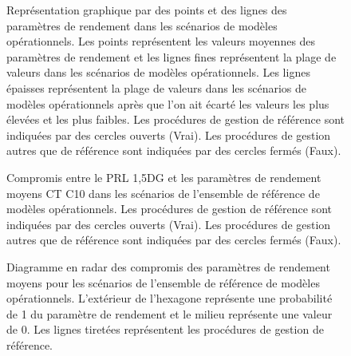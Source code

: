 \documentclass[french,11pt]{book}
\begin{document}
\begin{figure}[htb]

{\centering {} 

}

\caption{Représentation graphique par des points et des lignes des paramètres de rendement dans les scénarios de modèles opérationnels. Les points représentent les valeurs moyennes des paramètres de rendement et les lignes fines représentent la plage de valeurs dans les scénarios de modèles opérationnels. Les lignes épaisses représentent la plage de valeurs dans les scénarios de modèles opérationnels après que l'on ait écarté les valeurs les plus élevées et les plus faibles. Les procédures de gestion de référence sont indiquées par des cercles ouverts (Vrai). Les procédures de gestion autres que de référence sont indiquées par des cercles fermés (Faux).}\label{fig:dot-lines}
\end{figure}
\clearpage
\begin{figure}[htb]

{\centering {} 

}

\caption{Compromis entre le PRL 1,5DG et les paramètres de rendement moyens CT C10 dans les scénarios de l’ensemble de référence de modèles opérationnels. Les procédures de gestion de référence sont indiquées par des cercles ouverts (Vrai). Les procédures de gestion autres que de référence sont indiquées par des cercles fermés (Faux).}\label{fig:tradeoff-reference}
\end{figure}
\clearpage
\begin{figure}[htb]

{\centering {} 

}

\caption{Diagramme en radar des compromis des paramètres de rendement moyens pour les scénarios de l’ensemble de référence de modèles opérationnels. L’extérieur de l’hexagone représente une probabilité de 1 du paramètre de rendement et le milieu représente une valeur de 0. Les lignes tiretées représentent les procédures de gestion de référence.}\label{fig:spider-satisficed-mps-avg}
\end{figure}
\end{document}
